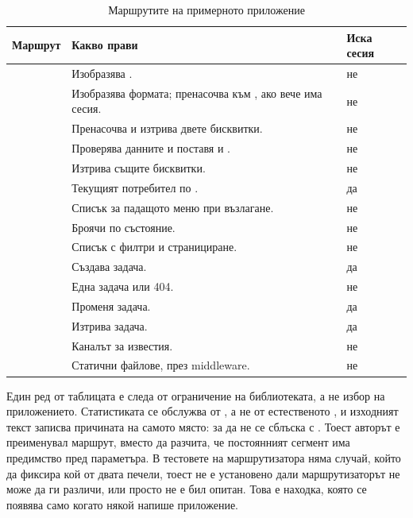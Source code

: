 \begin{table}[H]
\centering
\caption{Маршрутите на примерното приложение}
\label{tab:example-routes}
\begin{tabular}{@{}L{4.4cm}L{7.4cm}L{2.0cm}@{}}
\toprule
\textbf{Маршрут} & \textbf{Какво прави} & \textbf{Иска сесия} \\
\midrule
{} & Изобразява . & не \\
 & Изобразява формата; пренасочва към \code{/}, ако вече има сесия. & не \\
 & Пренасочва и изтрива двете бисквитки. & не \\
\midrule
{} & Проверява данните и поставя  и . & не \\
 & Изтрива същите бисквитки. & не \\
 & Текущият потребител по . & да \\
 & Списък за падащото меню при възлагане. & не \\
\midrule
{} & Броячи по състояние. & не \\
 & Списък с филтри и странициране. & не \\
 & Създава задача. & да \\
 & Една задача или 404. & не \\
 & Променя задача. & да \\
 & Изтрива задача. & да \\
\midrule
{} & Каналът за известия. & не \\
 & Статични файлове, през middleware. & не \\
\bottomrule
\end{tabular}
\end{table}

Един ред от таблицата е следа от ограничение на библиотеката, а не избор на приложението.
Статистиката се обслужва от , а не от естественото
, и изходният текст записва причината на самото място: за да не се
сблъска с . Тоест авторът е преименувал маршрут, вместо да разчита,
че постоянният сегмент има предимство пред параметъра. В тестовете на маршрутизатора няма
случай, който да фиксира кой от двата печели, тоест не е установено дали маршрутизаторът
не може да ги различи, или просто не е бил опитан. Това е находка, която се появява само
когато някой напише приложение.

